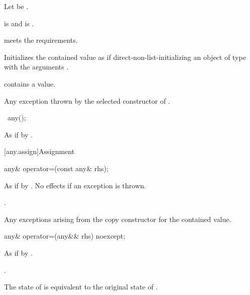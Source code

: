 \begin{itemdescr}
\pnum
Let  be .

\pnum
\constraints
{} is  and
 is .

\pnum
\expects
{} meets the  requirements.

\pnum
\effects
Initializes the contained value as if direct-non-list-initializing an object of
type  with the arguments .

\pnum
\ensures
{} contains a value.

\pnum
\throws
Any exception thrown by the selected constructor of .
\end{itemdescr}

\begin{itemdecl}
~any();
\end{itemdecl}

\begin{itemdescr}
\pnum
\effects
As if by .
\end{itemdescr}

[any.assign]{Assignment}

%
\begin{itemdecl}
any& operator=(const any& rhs);
\end{itemdecl}

\begin{itemdescr}
\pnum
\effects
As if by .
No effects if an exception is thrown.

\pnum
\returns
{}.

\pnum
\throws
Any exceptions arising from the copy constructor for the contained value.
\end{itemdescr}

%
\begin{itemdecl}
any& operator=(any&& rhs) noexcept;
\end{itemdecl}

\begin{itemdescr}
\pnum
\effects
As if by .

\pnum
\returns
{}.

\pnum
\ensures
The state of  is equivalent to the original state of .
\end{itemdescr}

